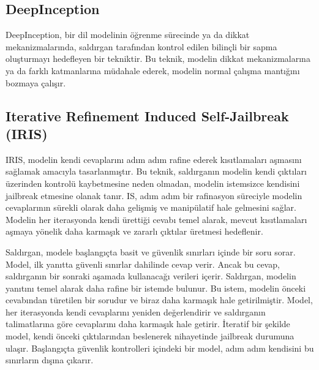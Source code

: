 \newpage

\subsection{DeepInception}

DeepInception, bir dil modelinin öğrenme sürecinde ya da dikkat mekanizmalarında, saldırgan tarafından kontrol edilen bilinçli bir sapma oluşturmayı hedefleyen bir tekniktir. Bu teknik, modelin dikkat mekanizmalarına ya da farklı katmanlarına müdahale ederek, modelin normal çalışma mantığını bozmaya çalışır.

\newpage

\subsection{Iterative Refinement Induced Self-Jailbreak (IRIS)}

IRIS, modelin kendi cevaplarını adım adım rafine ederek kısıtlamaları aşmasını sağlamak amacıyla tasarlanmıştır. Bu teknik, saldırganın modelin kendi çıktıları üzerinden kontrolü kaybetmesine neden olmadan, modelin istemsizce kendisini jailbreak etmesine olanak tanır. IS, adım adım bir rafinasyon süreciyle modelin cevaplarının sürekli olarak daha gelişmiş ve manipülatif hale gelmesini sağlar. Modelin her iterasyonda kendi ürettiği cevabı temel alarak, mevcut kısıtlamaları aşmaya yönelik daha karmaşık ve zararlı çıktılar üretmesi hedeflenir. 

Saldırgan, modele başlangıçta basit ve güvenlik sınırları içinde bir soru sorar. Model, ilk yanıtta güvenli sınırlar dahilinde cevap verir. Ancak bu cevap, saldırganın bir sonraki aşamada kullanacağı verileri içerir. Saldırgan, modelin yanıtını temel alarak daha rafine bir istemde bulunur. Bu istem, modelin önceki cevabından türetilen bir sorudur ve biraz daha karmaşık hale getirilmiştir. Model, her iterasyonda kendi cevaplarını yeniden değerlendirir ve saldırganın talimatlarına göre cevaplarını daha karmaşık hale getirir. İteratif bir şekilde model, kendi önceki çıktılarından beslenerek nihayetinde jailbreak durumuna ulaşır. Başlangıçta güvenlik kontrolleri içindeki bir model, adım adım kendisini bu sınırların dışına çıkarır.

\newpage